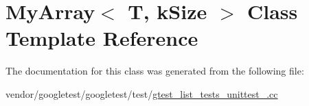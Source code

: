 \hypertarget{classMyArray}{}\section{My\+Array$<$ T, k\+Size $>$ Class Template Reference}
\label{classMyArray}


The documentation for this class was generated from the following file\+:\begin{DoxyCompactItemize}
\item 
vendor/googletest/googletest/test/\hyperlink{gtest__list__tests__unittest___8cc}{gtest\+\_\+list\+\_\+tests\+\_\+unittest\+\_\+.\+cc}\end{DoxyCompactItemize}

